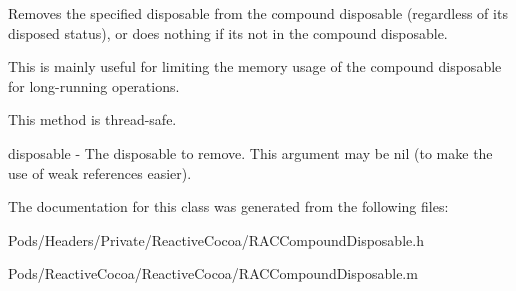 Removes the specified disposable from the compound disposable (regardless of its disposed status), or does nothing if it\textquotesingle{}s not in the compound disposable.

This is mainly useful for limiting the memory usage of the compound disposable for long-\/running operations.

This method is thread-\/safe.

disposable -\/ The disposable to remove. This argument may be nil (to make the use of weak references easier). 

The documentation for this class was generated from the following files\+:\begin{DoxyCompactItemize}
\item 
Pods/\+Headers/\+Private/\+Reactive\+Cocoa/R\+A\+C\+Compound\+Disposable.\+h\item 
Pods/\+Reactive\+Cocoa/\+Reactive\+Cocoa/R\+A\+C\+Compound\+Disposable.\+m\end{DoxyCompactItemize}
